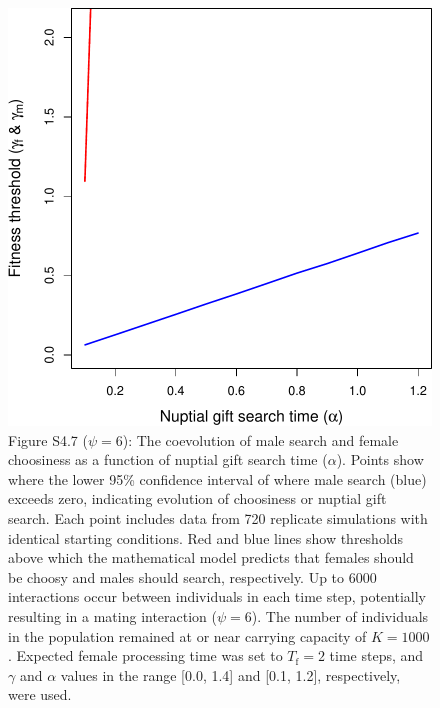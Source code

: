 \documentclass[
]{article}
\begin{document}
\begin{figure}
\centering
\includegraphics{ms_refs_fixed_files/figure-latex/unnamed-chunk-12-1.pdf}
\caption{Figure S4.7 (\(\psi = 6\)): The coevolution of male search and
female choosiness as a function of nuptial gift search time
(\(\alpha\)). Points show where the lower 95\% confidence interval of
where male search (blue) exceeds zero, indicating evolution of
choosiness or nuptial gift search. Each point includes data from 720
replicate simulations with identical starting conditions. Red and blue
lines show thresholds above which the mathematical model predicts that
females should be choosy and males should search, respectively. Up to
6000 interactions occur between individuals in each time step,
potentially resulting in a mating interaction (\(\psi = 6\)). The number
of individuals in the population remained at or near carrying capacity
of \(K = 1000\). Expected female processing time was set to
\(T_{\mathrm{f}}=2\) time steps, and \(\gamma\) and \(\alpha\) values in
the range {[}0.0, 1.4{]} and {[}0.1, 1.2{]}, respectively, were used.}
\end{figure}

\captionsetup{labelformat=default}

\clearpage

\captionsetup{labelformat=empty}
\end{document}
